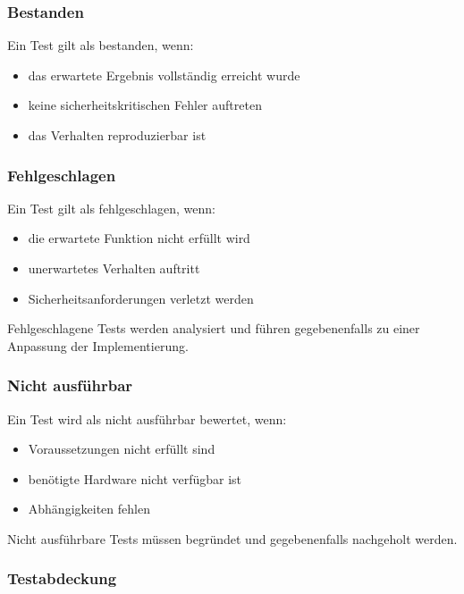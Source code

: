 \documentclass[
  a4paper,
  12pt,
  DIV=12,        %
  parskip=half,  %
  headings=small %
]{scrartcl}
\theoremstyle{definition}
\providecommand{\tightlist}{%
  \setlength{\itemsep}{0pt}\setlength{\parskip}{0pt}}
\theoremstyle{definition}
\begin{document}
\subsubsection{Bestanden}\label{bestanden}

Ein Test gilt als bestanden, wenn:

\begin{itemize}
\tightlist
\item
  das erwartete Ergebnis vollständig erreicht wurde
\item
  keine sicherheitskritischen Fehler auftreten
\item
  das Verhalten reproduzierbar ist
\end{itemize}

\subsubsection{Fehlgeschlagen}\label{fehlgeschlagen}

Ein Test gilt als fehlgeschlagen, wenn:

\begin{itemize}
\tightlist
\item
  die erwartete Funktion nicht erfüllt wird
\item
  unerwartetes Verhalten auftritt
\item
  Sicherheitsanforderungen verletzt werden
\end{itemize}

Fehlgeschlagene Tests werden analysiert und führen gegebenenfalls zu
einer Anpassung der Implementierung.

\subsubsection{Nicht ausführbar}\label{nicht-ausfuxfchrbar}

Ein Test wird als nicht ausführbar bewertet, wenn:

\begin{itemize}
\tightlist
\item
  Voraussetzungen nicht erfüllt sind
\item
  benötigte Hardware nicht verfügbar ist
\item
  Abhängigkeiten fehlen
\end{itemize}

Nicht ausführbare Tests müssen begründet und gegebenenfalls nachgeholt
werden.

\subsubsection{Testabdeckung}\label{testabdeckung}
\end{document}
